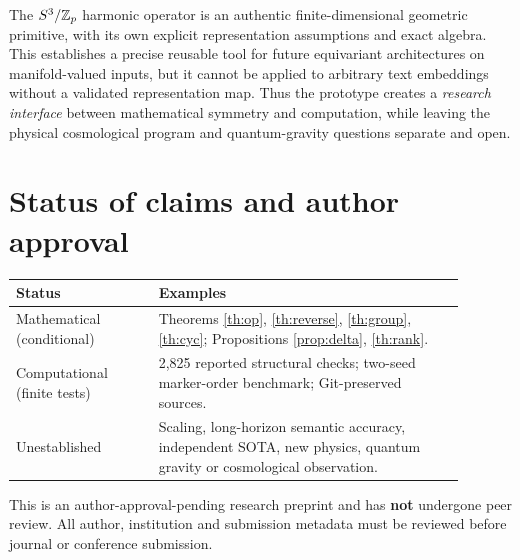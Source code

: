 \documentclass[11pt,a4paper]{article}
\theoremstyle{plain}\newtheorem{theorem}{Theorem}[section]\newtheorem{proposition}[theorem]{Proposition}\newtheorem{lemma}[theorem]{Lemma}
\theoremstyle{definition}\newtheorem{definition}[theorem]{Definition}\newtheorem{remark}[theorem]{Remark}\newtheorem{counterexample}[theorem]{Counterexample}
\begin{document}
The $S^3/\mathbb Z_p$ harmonic operator is an authentic finite-dimensional geometric primitive, with its own explicit representation assumptions and exact algebra. This establishes a precise reusable tool for future equivariant architectures on manifold-valued inputs, but it cannot be applied to arbitrary text embeddings without a validated representation map. Thus the prototype creates a \emph{research interface} between mathematical symmetry and computation, while leaving the physical cosmological program and quantum-gravity questions separate and open.

\section*{Status of claims and author approval}
\begin{center}\begin{tabular}{p{0.29\linewidth}p{0.6\linewidth}}\toprule
\textbf{Status}&\textbf{Examples}\\\midrule
Mathematical (conditional)&Theorems \ref{th:op}, \ref{th:reverse}, \ref{th:group}, \ref{th:cyc}; Propositions \ref{prop:delta}, \ref{th:rank}.\\
Computational (finite tests)&2,825 reported structural checks; two-seed marker-order benchmark; Git-preserved sources.\\
Unestablished&Scaling, long-horizon semantic accuracy, independent SOTA, new physics, quantum gravity or cosmological observation.\\\bottomrule
\end{tabular}\end{center}
This is an author-approval-pending research preprint and has \textbf{not} undergone peer review. All author, institution and submission metadata must be reviewed before journal or conference submission.

\clearpage
\appendix
\end{document}
